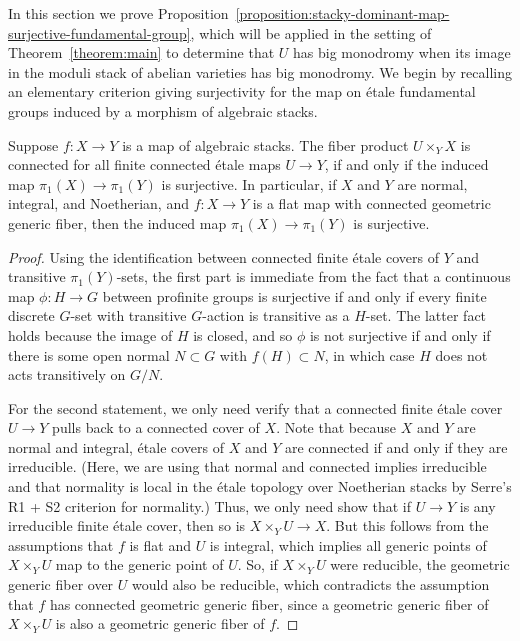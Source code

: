 In this section we prove Proposition~\ref{proposition:stacky-dominant-map-surjective-fundamental-group}, which will be applied
in the setting of Theorem~\ref{theorem:main} to determine
that $U$ has big monodromy when its image in the moduli stack of
abelian varieties has big monodromy. We begin by recalling an elementary criterion giving surjectivity for the map on \'{e}tale fundamental groups induced by a morphism of algebraic stacks.
\begin{lemma}
       \label{lemma:surjectivity-criterion-pi1}
       Suppose $f\colon X \rightarrow Y$ is a map of algebraic stacks.
       The fiber product $U \times_Y X$ is connected
       for all finite connected \'etale maps $U \rightarrow Y$,
       if and only if
       the induced map $\pi_1(X) \rightarrow \pi_1(Y)$ is surjective.
       In particular, if $X$ and $Y$ are normal, integral, and Noetherian, and $f: X \rightarrow Y$ is a flat map with connected geometric
       generic fiber, then the induced map $\pi_1(X) \rightarrow \pi_1(Y)$ is surjective.
\end{lemma}
\begin{proof}
Using the identification between connected finite \'etale covers of $Y$ and transitive $\pi_1(Y)$-sets, the first part is immediate from the fact that a continuous map $\phi \colon H \rightarrow G$ between profinite groups is surjective if and only if every finite discrete $G$-set with transitive $G$-action is transitive as a $H$-set.
The latter fact holds because the image of $H$ is closed, and so $\phi$ is not surjective if and only if there is some open normal
$N \subset G$ with $f(H) \subset N$, in which case $H$ does not acts transitively on $G/N$.

For the second statement,
we only need verify that a connected finite \'etale cover $U \rightarrow Y$ pulls back to a connected cover of $X$.
Note that because $X$ and $Y$ are normal and integral, \'etale covers of $X$ and $Y$ are connected if and only if they are irreducible. (Here, we are using that
normal and connected implies irreducible and that
normality is local in the \'etale topology over Noetherian stacks by Serre's R1 + S2 criterion for normality.)
Thus, we only need show that if $U \rightarrow Y$ is any irreducible finite \'etale cover, then so is $X \times_Y U \rightarrow X$.
But this follows from the assumptions that $f$ is flat and $U$ is integral,
which implies all generic points of $X \times_Y U$ map to the generic point of $U$.
So, if $X \times_Y U$ were reducible, the geometric generic fiber over $U$ would also be
reducible, which contradicts the assumption that $f$ has connected geometric generic fiber, since a geometric generic fiber of
$X \times_Y U$ is also a geometric generic fiber of $f$.
\end{proof}

